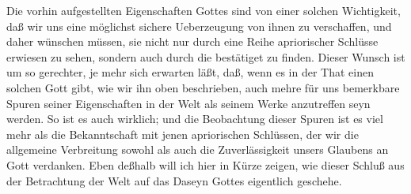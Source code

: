 Die vorhin aufgestellten Eigenschaften Gottes sind von einer solchen Wichtigkeit, daß wir uns eine möglichst sichere Ueberzeugung von ihnen zu verschaffen, und daher wünschen müssen, sie nicht nur durch eine Reihe apriorischer Schlüsse erwiesen zu sehen, sondern auch durch die  bestätiget zu finden. Dieser Wunsch ist um so gerechter, je mehr sich erwarten läßt, daß, wenn es in der That einen solchen Gott gibt, wie wir ihn oben beschrieben, auch mehre für uns bemerkbare Spuren seiner Eigenschaften in der Welt als seinem Werke anzutreffen seyn werden. So ist es auch wirklich; und die Beobachtung dieser Spuren ist es viel mehr als die Bekanntschaft mit jenen apriorischen Schlüssen, der wir die allgemeine Verbreitung sowohl als auch die Zuverlässigkeit unsers Glaubens an Gott verdanken. Eben deßhalb will ich hier in Kürze zeigen, wie dieser Schluß aus der Betrachtung der Welt auf das Daseyn Gottes eigentlich geschehe.
